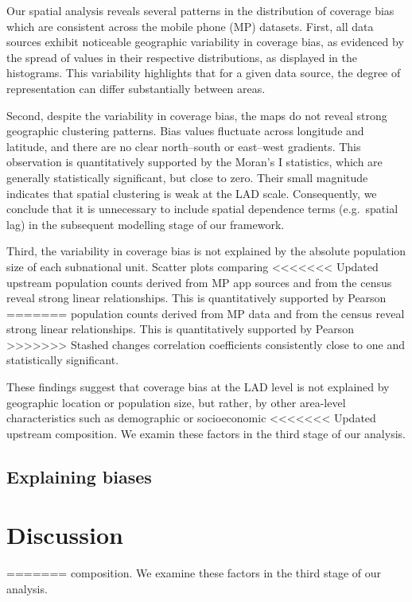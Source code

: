 \documentclass[]{rsos}%
\begin{document}
Our spatial analysis reveals several patterns in the distribution of
coverage bias which are consistent across the mobile phone (MP)
datasets. First, all data sources exhibit noticeable geographic
variability in coverage bias, as evidenced by the spread of values in
their respective distributions, as displayed in the histograms. This
variability highlights that for a given data source, the degree of
representation can differ substantially between areas.

Second, despite the variability in coverage bias, the maps do not reveal
strong geographic clustering patterns. Bias values fluctuate across
longitude and latitude, and there are no clear north--south or east--west
gradients. This observation is quantitatively supported by the Moran's I
statistics, which are generally statistically significant, but close to
zero. Their small magnitude indicates that spatial clustering is weak at
the LAD scale. Consequently, we conclude that it is unnecessary to
include spatial dependence terms (e.g.~spatial lag) in the subsequent
modelling stage of our framework.

Third, the variability in coverage bias is not explained by the absolute
population size of each subnational unit. Scatter plots comparing
<<<<<<< Updated upstream
population counts derived from MP app sources and from the census reveal
strong linear relationships. This is quantitatively supported by Pearson
=======
population counts derived from MP data and from the census reveal strong
linear relationships. This is quantitatively supported by Pearson
>>>>>>> Stashed changes
correlation coefficients consistently close to one and statistically
significant.

These findings suggest that coverage bias at the LAD level is not
explained by geographic location or population size, but rather, by
other area-level characteristics such as demographic or socioeconomic
<<<<<<< Updated upstream
composition. We examin these factors in the third stage of our analysis.

\subsection{Explaining biases}\label{explaining-biases}

\section{Discussion}\label{discussion}

=======
composition. We examine these factors in the third stage of our
analysis.
\end{document}
